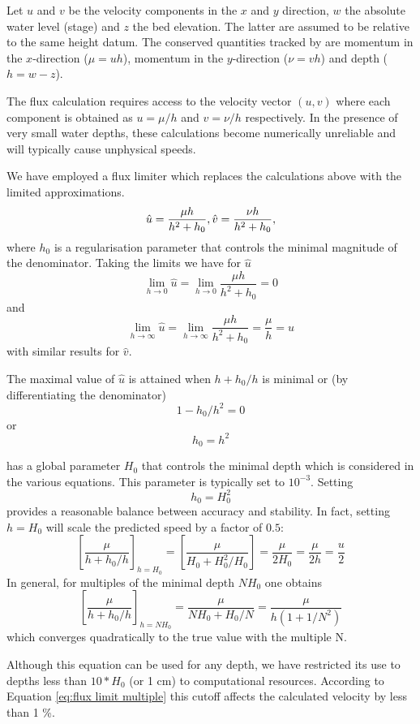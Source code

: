 \documentclass{manual}
\begin{document}
Let $u$ and $v$ be the velocity components in the $x$ and $y$ direction,
$w$ the absolute water level (stage) and
$z$ the bed elevation. The latter are assumed to be relative to the
same height datum.
The conserved quantities tracked by \anuga are momentum in the
$x$-direction ($\mu = uh$), momentum in the $y$-direction ($\nu = vh$)
and depth ($h = w-z$).

The flux calculation requires access to the velocity vector $(u, v)$
where each component is obtained as $u = \mu/h$ and $v = \nu/h$ respectively.
In the presence of very small water depths, these calculations become
numerically unreliable and will typically cause unphysical speeds.

We have employed a flux limiter which replaces the calculations above with
the limited approximations.
\begin{equation}
  \hat{u} = \frac{\mu h}{h^2 + h_0}, \bigskip \hat{v} = \frac{\nu h}{h^2 + h_0},
\end{equation}
where $h_0$ is a regularisation parameter that controls the minimal
magnitude of the denominator. Taking the limits we have for $\hat{u}$
\[
  \lim_{h \rightarrow 0} \hat{u} =
  \lim_{h \rightarrow 0} \frac{\mu h}{h^2 + h_0} = 0
\]
and
\[
  \lim_{h \rightarrow \infty} \hat{u} =
  \lim_{h \rightarrow \infty} \frac{\mu h}{h^2 + h_0} = \frac{\mu}{h} = u
\]
with similar results for $\hat{v}$.

The maximal value of $\hat{u}$ is attained when $h+h_0/h$ is minimal or (by differentiating the denominator)
\[
  1 - h_0/h^2 = 0
\]
or
\[
  h_0 = h^2
\]

\anuga has a global parameter $H_0$ that controls the minimal depth which
is considered in the various equations. This parameter is typically set to
$10^{-3}$. Setting
\[
  h_0 = H_0^2
\]
provides a reasonable balance between accuracy and stability. In fact,
setting $h=H_0$ will scale the predicted speed by a factor of $0.5$:
\[
  \left[ \frac{\mu}{h + h_0/h} \right]_{h = H_0} = 
  \left[ \frac{\mu}{H_0 + H_0^2/H_0} \right] = 
  \frac{\mu}{2 H_0} = \frac{\mu}{2 h} = \frac{u}{2} 
\]
In general, for multiples of the minimal depth $N H_0$ one obtains
\begin{equation}
  \left[ \frac{\mu}{h + h_0/h} \right]_{h = N H_0} =
  \frac{\mu}{N H_0 + H_0/N} =   
  \frac{\mu}{h (1 + 1/N^2)} 
  \label{eq:flux limit multiple} 
\end{equation} 
which converges quadratically to the true value with the multiple N.

Although this equation can be used for any depth, we have restricted its use to depths less than $10 * H_0$ (or 1 cm) to computational resources.  
According to Equation \ref{eq:flux limit multiple} this cutoff    
affects the calculated velocity by less than 1 \%. 
\end{document}
